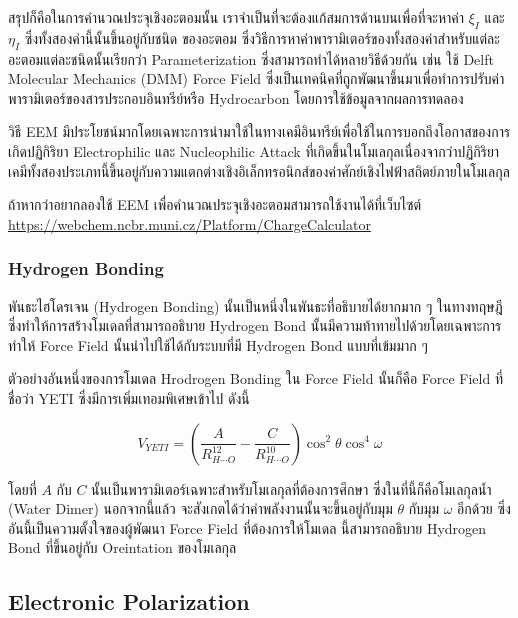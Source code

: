 สรุปก็คือในการคำนวณประจุเชิงอะตอมนั้น เราจำเป็นที่จะต้องแก้สมการด้านบนเพื่อที่จะหาค่า $\xi_I$ และ $\eta_I$ ซึ่งทั้งสองค่านี้นั้นขึ้นอยู่กับชนิด%
ของอะตอม ซึ่งวิธีการหาค่าพารามิเตอร์ของทั้งสองค่าสำหรับแต่ละอะตอมแต่ละชนิดนั้นเรียกว่า Parameterization ซึ่งสามารถทำได้หลายวิธีด้วยกัน เช่น 
ใช้ Delft Molecular Mechanics (DMM) Force Field ซึ่งเป็นเทคนิคที่ถูกพัฒนาขึ้นมาเพื่อทำการปรับค่าพารามิเตอร์ของสารประกอบอินทรีย์หรือ
Hydrocarbon โดยการใช้ข้อมูลจากผลการทดลอง 

วิธี EEM มีประโยชน์มากโดยเฉพาะการนำมาใช้ในทางเคมีอินทรีย์เพื่อใช้ในการบอกถึงโอกาสของการเกิดปฏิกิริยา Electrophilic และ Nucleophilic 
Attack ที่เกิดขึ้นในโมเลกุลเนื่องจากว่าปฏิกิริยาเคมีทั้งสองประเภทนี้ขึ้นอยู่กับความแตกต่างเชิงอิเล็กทรอนิกส์ของค่าศักย์เชิงไฟฟ้าสถิตย์ภายในโมเลกุล 

ถ้าหากว่าอยากลองใช้ EEM เพื่อคำนวณประจุเชิงอะตอมสามารถใช้งานได้ที่เว็บไซต์ \url{https://webchem.ncbr.muni.cz/Platform/ChargeCalculator}

\subsubsection{Hydrogen Bonding}

พันธะไฮโดรเจน (Hydrogen Bonding) นั้นเป็นหนึ่งในพันธะที่อธิบายได้ยากมาก ๆ ในทางทฤษฎี ซึ่งทำให้การสร้างโมเดลที่สามารถอธิบาย Hydrogen 
Bond นั้นมีความท้าทายไปด้วยโดยเฉพาะการทำให้ Force Field นั้นนำไปใช้ได้กับระบบที่มี Hydrogen Bond แบบที่เข้มมาก ๆ 

ตัวอย่างอันหนึ่งของการโมเดล Hrodrogen Bonding ใน Force Field นั้นก็คือ Force Field ที่ชื่อว่า YETI ซึ่งมีการเพิ่มเทอมพิเศษเข้าไป ดังนี้ 

\begin{equation}
    V_{YETI}
    =
    \left(
        \frac{A}{R^{12}_{H \cdots O}} 
        - \frac{C}{R^{10}_{H \cdots O}} 
    \right)
    \cos^{2} \theta 
    \cos^{4} \omega
\end{equation}

\noindent โดยที่ $A$ กับ $C$ นั้นเป็นพารามิเตอร์เฉพาะสำหรับโมเลกุลที่ต้องการศึกษา ซึ่งในที่นี้ก็คือโมเลกุลน้ำ (Water Dimer) นอกจากนี้แล้ว%
จะสังเกตได้ว่าค่าพลังงานนั้นจะขึ้นอยู่กับมุม $\theta$ กับมุม $\omega$ อีกด้วย ซึ่งอันนี้เป็นความตั้งใจของผู้พัฒนา Force Field ที่ต้องการให้โมเดล%
นี้สามารถอธิบาย Hydrogen Bond ที่ขึ้นอยู่กับ Oreintation ของโมเลกุล 

\subsection{Electronic Polarization}

